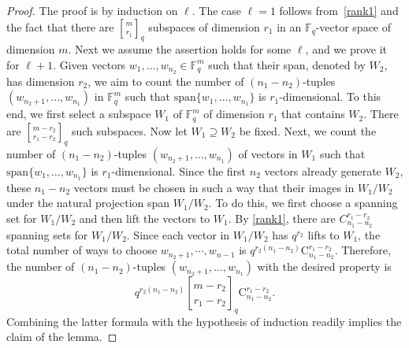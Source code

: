 \documentclass[12pt,a4paper,reqno]{amsart}
\theoremstyle{plain}
\theoremstyle{definition}
\newcommand{\FF}{{\mathbb{F}}}
\newcommand{\1}{\mathds{1}}
\begin{document}
\begin{proof}
The proof is by induction on $\ell$. The case $\ell=1$
 follows from~\cref{rank1} and the fact that 
there are $
{m\brack r_1}_q
$ 
subspaces of dimension $r_1$ in an $\FF_q$-vector space of dimension $m$.
Next we assume the assertion holds for some $\ell$, and we prove it for $\ell+1$. Given vectors $w_1, \dots, w_{n_2}\in\mathbb{F}_q^m$ such that their span, denoted by $W_2$, has dimension $r_2$, we aim to count the number of $(n_1 - n_2)$-tuples $(w_{n_2+1}, \dots, w_{n_1})$ in $\mathbb{F}_q^m$ such that $\mathrm{span}\{w_1, \dots, w_{n_1}\}$ is $r_1$-dimensional. 
To this end, we first select a subspace $W_1$ of $\mathbb{F}_q^m$ of dimension $r_1$ that contains $W_2$. There are
$
{m - r_2 \brack r_1 - r_2}_q
$
such subspaces. Now let $W_1 \supseteq W_2$ be fixed. Next, we count the number of $(n_1 - n_2)$-tuples $(w_{n_2+1}, \dots, w_{n_1})$ of vectors in $W_1$ such that  $\mathrm{span}\{w_1, \dots, w_{n_1}\}$ is $r_1$-dimensional. Since the first $n_2$ vectors already generate $W_2$, these $n_1 - n_2$ vectors must be chosen in such a way that their images in $W_1 / W_2$ under the natural projection span $W_1 / W_2$. To do this, we first choose a spanning set for $W_1 / W_2$ and then lift the vectors to $W_1$. By \cref{rank1}, there are $C_{n_1 - n_2}^{r_1 - r_2}$ spanning sets for $W_1/W_2$. Since each vector in $W_1 / W_2$ has $q^{r_2}$ lifts to $W_1$, the total number of ways to choose $w_{n_2+1},\cdots,w_{n-1}$ is
$
q^{r_2(n_1 - n_2)} \mathrm{C}_{n_1 - n_2}^{r_1 - r_2}
$.
Therefore, the number of $(n_1 - n_2)$-tuples $(w_{n_2+1}, \dots, w_{n_1})$ with the desired property is
$$
q^{r_2(n_1 - n_2)} {m - r_2 \brack r_1 - r_2}_q \mathrm{C}_{n_1 - n_2}^{r_1 - r_2}.
$$
Combining the latter formula with the hypothesis of induction readily implies the claim of the lemma.
\end{proof}


  


\end{document}
